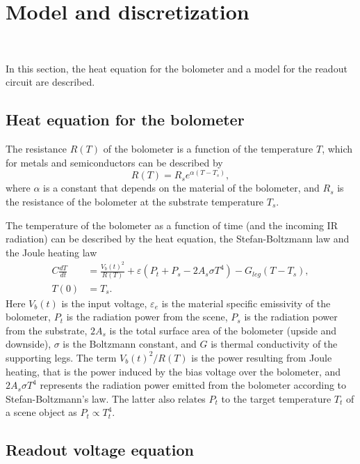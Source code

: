 \section{Model and discretization}~\label{sec:model_disc}

In this section, the heat equation for the bolometer and a model for the
readout circuit are described.

\subsection{Heat equation for the bolometer}

The resistance $R(T)$ of the bolometer is a function of the
temperature $T$, which for
metals and semiconductors can be described by~\cite{xiu2010research}
\begin{equation}
  \label{eq:resistance_temperature}
  R(T)=R_s e^{\alpha(T-T_s)},
\end{equation}
where $\alpha$ is a constant that depends on the material of the
bolometer, and $R_s$ is the resistance of the bolometer at the
substrate temperature $T_s$.

The temperature of the bolometer as a function of time (and the
incoming IR radiation) can be described by the heat equation, the
Stefan-Boltzmann law and the Joule heating law
\begin{align} \label{eq:heat_balance_equation}
 C\frac{dT}{dt}&=\frac{V_b(t)^2}{R(T)}+\varepsilon(P_t+P_s -2A_s \sigma T^4)-G_{leg}(T-T_s), \\
 T(0)&=T_s.	\nonumber
\end{align}
Here $V_b(t)$ is the input voltage, $\varepsilon_e$ is the material
specific emissivity of the bolometer, $P_t$ is the radiation power from
the scene, $P_s$ is the radiation power from the substrate, $2A_s$ is
the total surface area of the bolometer (upside and downside), $\sigma$ is
the Boltzmann constant, and $G$
is thermal conductivity of the supporting legs. The term
$V_b(t)^2/R(T)$ is the power resulting from Joule heating, that is
the power induced by the bias voltage over
the bolometer, and $2A_s \sigma T^4$ represents the radiation power
emitted from the bolometer according to Stefan-Boltzmann's law. The
latter also relates $P_t$ to the target temperature $T_t$ of a scene
object as $P_t \propto T_t^4$.



\subsection{Readout voltage equation}

